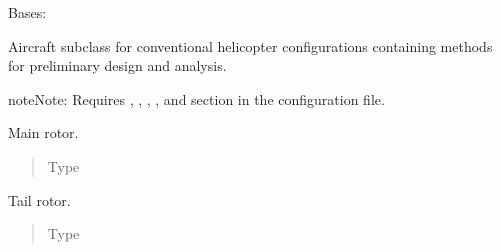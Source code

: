 \documentclass[letterpaper,10pt,english]{sphinxmanual}
\begin{document}
\begin{fulllineitems}
\label{\detokenize{modules/helicopter:helicopter.Helicopter}}
\sphinxAtStartPar
Bases: {\hyperref[\detokenize{modules/aircraft:aircraft.Aircraft}]{}}

\sphinxAtStartPar
Aircraft sub\sphinxhyphen{}class for conventional helicopter configurations containing
methods for preliminary design and analysis.

\begin{sphinxadmonition}{note}{Note:}
\sphinxAtStartPar
Requires , , , , and
 section in the configuration file.
\end{sphinxadmonition}

\begin{fulllineitems}
\label{\detokenize{modules/helicopter:helicopter.Helicopter.main_rotor}}
\sphinxAtStartPar
Main rotor.
\begin{quote}\begin{description}
\item[{Type}] \leavevmode
\sphinxAtStartPar
{\hyperref[\detokenize{modules/rotor:rotor.Rotor}]{}}

\end{description}\end{quote}

\end{fulllineitems}


\begin{fulllineitems}
\label{\detokenize{modules/helicopter:helicopter.Helicopter.tail_rotor}}
\sphinxAtStartPar
Tail rotor.
\begin{quote}\begin{description}
\item[{Type}] \leavevmode
\sphinxAtStartPar
{\hyperref[\detokenize{modules/rotor:rotor.Rotor}]{}}


\end{description}
\end{quote}
\end{fulllineitems}
\end{fulllineitems}
\end{document}
